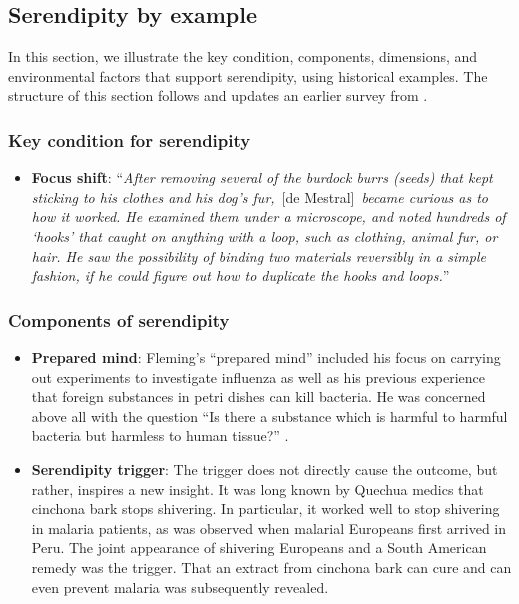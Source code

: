 \subsection{Serendipity by example} \label{sec:by-example}

In this section, we illustrate the key condition, components,
dimensions, and environmental factors that support serendipity, using
historical examples.  The structure of this section follows and
updates an earlier survey from .

\subsubsection*{Key condition for serendipity}

\begin{itemize}
\item \textbf{Focus shift}: ``\emph{After removing several of the
  burdock burrs (seeds) that kept sticking to his clothes and his
  dog's fur,}~[de Mestral]~\emph{became curious as to how it
  worked. He examined them under a microscope, and noted hundreds of
  `hooks' that caught on anything with a loop, such as clothing,
  animal fur, or hair. He saw the possibility of binding two materials
  reversibly in a simple fashion, if he could figure out how to
  duplicate the hooks and loops.}''~\cite{wiki:velcro}
\end{itemize}

\subsubsection*{Components of serendipity}

\begin{itemize}
\item \textbf{Prepared mind}: 
Fleming's ``prepared mind'' included his focus
on carrying out experiments to investigate influenza as well as his
previous experience that foreign substances in petri dishes can kill
bacteria.  He was concerned above all with the question ``Is there a
substance which is harmful to harmful bacteria but harmless to human
tissue?''  \cite[p. 161]{roberts}.
\end{itemize}

\begin{itemize}
\item \textbf{Serendipity trigger}: The trigger does not directly
  cause the outcome, but rather, inspires a new insight.  It was long
  known by Quechua medics that cinchona bark stops shivering.  In
  particular, it worked well to stop shivering in malaria patients, as
  was observed when malarial Europeans first arrived in Peru.  The
  joint appearance of shivering Europeans and a South American remedy
  was the trigger.  That an extract from cinchona bark can cure and
  can even prevent malaria was subsequently revealed.
\end{itemize}

